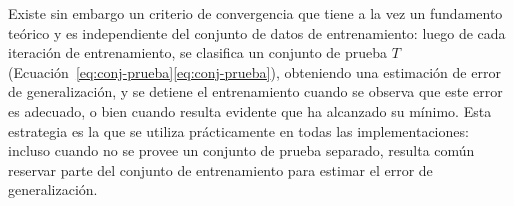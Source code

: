 Existe sin embargo un criterio de convergencia que tiene a la vez un
fundamento teórico y es independiente del conjunto de datos de
entrenamiento: luego de cada iteración de entrenamiento, se clasifica
un conjunto de prueba $T$
(\iflatexml{}Ecuación~\ref{eq:conj-prueba}\else\autoref{eq:conj-prueba}\fi),
obteniendo una estimación de error de generalización, y se detiene el
entrenamiento cuando se observa que este error es adecuado, o bien
cuando resulta evidente que ha alcanzado su mínimo. Esta estrategia es
la que se utiliza prácticamente en todas las implementaciones: incluso
cuando no se provee un conjunto de prueba separado, resulta común
reservar parte del conjunto de entrenamiento para estimar el error de
generalización.



